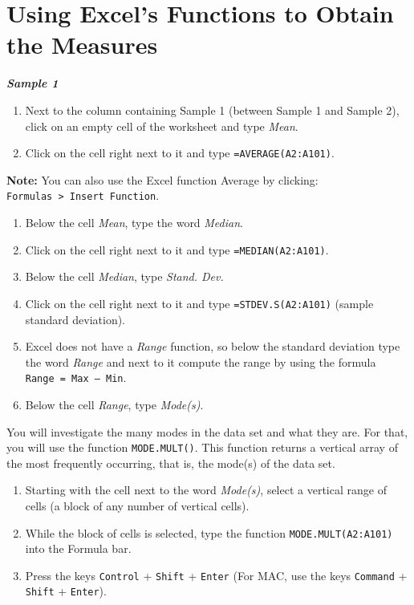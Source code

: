 \documentclass[
]{book}
\providecommand{\tightlist}{%
  \setlength{\itemsep}{0pt}\setlength{\parskip}{0pt}}
\begin{document}
\hypertarget{excel-functions}{%
\section{Using Excel's Functions to Obtain the Measures}\label{excel-functions}}

\textbf{\emph{Sample 1}}

\begin{enumerate}
\def\labelenumi{\arabic{enumi}.}
\tightlist
\item
  Next to the column containing Sample 1 (between Sample 1 and Sample 2), click on an empty cell of the worksheet and type \emph{Mean}.
\item
  Click on the cell right next to it and type \texttt{=AVERAGE(A2:A101)}.
\end{enumerate}

\textbf{Note:} You can also use the Excel function Average by clicking: \texttt{Formulas\ \textgreater{}\ Insert\ Function}.

\begin{enumerate}
\def\labelenumi{\arabic{enumi}.}
\setcounter{enumi}{2}
\tightlist
\item
  Below the cell \emph{Mean}, type the word \emph{Median}.
\item
  Click on the cell right next to it and type \texttt{=MEDIAN(A2:A101)}.
\item
  Below the cell \emph{Median}, type \emph{Stand. Dev.}
\item
  Click on the cell right next to it and type \texttt{=STDEV.S(A2:A101)} (sample standard deviation).
\item
  Excel does not have a \emph{Range} function, so below the standard deviation type the word \emph{Range} and next to it compute the range by using the formula \texttt{Range\ =\ Max\ –\ Min}.
\item
  Below the cell \emph{Range}, type \emph{Mode(s)}.
\end{enumerate}

You will investigate the many modes in the data set and what they are. For that, you will use the function \texttt{MODE.MULT()}. This function returns a vertical array of the most frequently occurring, that is, the mode(s) of the data set.

\begin{enumerate}
\def\labelenumi{\arabic{enumi}.}
\setcounter{enumi}{8}
\tightlist
\item
  Starting with the cell next to the word \emph{Mode(s)}, select a vertical range of cells (a block of any number of vertical cells).
\item
  While the block of cells is selected, type the function \texttt{MODE.MULT(A2:A101)} into the Formula bar.
\item
  Press the keys \texttt{Control} + \texttt{Shift} + \texttt{Enter} (For MAC, use the keys \texttt{Command} + \texttt{Shift} + \texttt{Enter}).
\end{enumerate}
\end{document}
